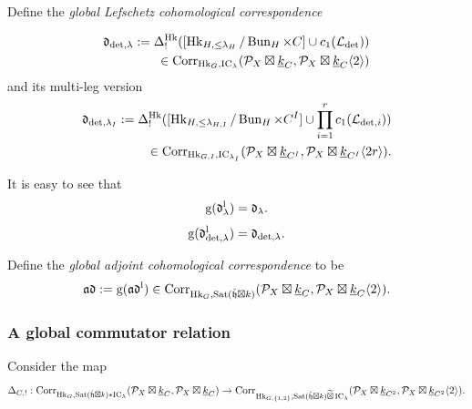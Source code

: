 \documentclass[reqno]{amsart}
\numberwithin{equation}{section}
\numberwithin{equation}{section}
\begin{document}
Define the \emph{global Lefschetz cohomological correspondence}

\begin{equation}\label{eq:lefcorglob}
    \begin{split}
\mathfrak{d}_{\det,\lambda}:=\Delta^{\operatorname{Hk}}_!([\operatorname{Hk}_{H,\leq\lambda_H}/\operatorname{Bun}_H\times C]\cup c_1(\mathcal{L}_{\det})) \\ \in \mathrm{Corr}_{\operatorname{Hk}_{G},\operatorname{IC}_{\lambda}}(\mathcal{P}_X\boxtimes\underline{k}_C,\mathcal{P}_X\boxtimes\underline{k}_C\langle 2\rangle) \end{split}
\end{equation}
and its multi-leg version
\begin{equation}\label{eq:lefcorglobmulti} \begin{split}
\mathfrak{d}_{\det,\lambda_I}:=\Delta^{\operatorname{Hk}}_!([\operatorname{Hk}_{H,\leq\lambda_{H,I}}/\operatorname{Bun}_H\times C^I]\cup \prod_{i=1}^r c_1(\mathcal{L}_{\det,i})) \\ \in \mathrm{Corr}_{\operatorname{Hk}_{G,I},\operatorname{IC}_{\lambda_I}}(\mathcal{P}_X\boxtimes\underline{k}_{C^I},\mathcal{P}_X\boxtimes\underline{k}_{C^I}\langle 2r\rangle)
.\end{split}\end{equation} 

It is easy to see that 
\begin{equation}
    \mathrm{g}(\mathfrak{d}_{\lambda}^{\mathrm{l}}) = \mathfrak{d}_{\lambda}.
\end{equation} 
\begin{equation}
    \mathrm{g}(\mathfrak{d}_{\det,\lambda}^{\mathrm{l}}) = \mathfrak{d}_{\det,\lambda}.
\end{equation} 




Define the \emph{global adjoint cohomological correspondence} to be \begin{equation}\label{eq:adjointcorglob}
    \mathfrak{a}\mathfrak{d}:=\mathrm{g}(\mathfrak{a}\mathfrak{d}^{\mathrm{l}})  \in \mathrm{Corr}_{\operatorname{Hk}_{G},\operatorname{Sat}(\check{\mathfrak{h}}\boxtimes k)}(\mathcal{P}_X\boxtimes\underline{k}_C,\mathcal{P}_X\boxtimes\underline{k}_C\langle 2\rangle) .
\end{equation}



\subsubsection{A global commutator relation}



Consider the map \begin{equation}
    \Delta_{C,!}:\mathrm{Corr}_{\operatorname{Hk}_G,\operatorname{Sat}(\check{\mathfrak{h}}\boxtimes k)*\operatorname{IC}_{\lambda}}(\mathcal{P}_X\boxtimes\underline{k}_C,\mathcal{P}_X\boxtimes\underline{k}_C)\to \mathrm{Corr}_{\operatorname{Hk}_{G,\{1,2\}},\operatorname{Sat}(\check{\mathfrak{h}}\boxtimes k)\widetilde{\boxtimes}\operatorname{IC}_{\lambda}}(\mathcal{P}_X\boxtimes\underline{k}_{C^2},\mathcal{P}_X\boxtimes \underline{k}_{C^2}\langle 2\rangle) .\end{equation}
\end{document}
